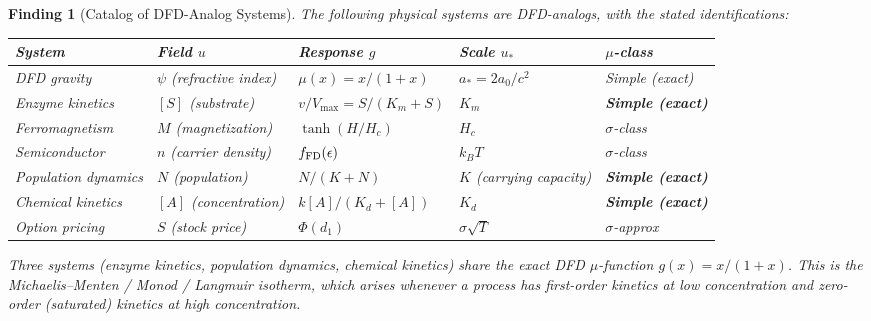 \documentclass[11pt]{article}
\newtheorem{finding}[theorem]{Finding}
\theoremstyle{definition}
\theoremstyle{remark}
\begin{document}
\begin{finding}[Catalog of DFD-Analog Systems]
\label{find:dfd-analog-catalog}
The following physical systems are DFD-analogs, with the stated
identifications:

\begin{center}
\begin{tabular}{@{}p{2.5cm}p{2.5cm}p{2.5cm}p{2cm}p{2.5cm}@{}}
\toprule
\textbf{System} & \textbf{Field $u$} & \textbf{Response $g$} &
\textbf{Scale $u_*$} & \textbf{$\mu$-class} \\
\midrule
DFD gravity & $\psi$ (refractive index) & $\mu(x) = x/(1+x)$ &
$a_* = 2a_0/c^2$ & Simple (exact) \\[4pt]
Enzyme kinetics & $[S]$ (substrate) &
$v/V_{\max} = S/(K_m + S)$ & $K_m$ &
\textbf{Simple (exact)} \\[4pt]
Ferromagnetism & $M$ (magnetization) &
$\tanh(H/H_c)$ & $H_c$ & $\sigma$-class \\[4pt]
Semiconductor & $n$ (carrier density) &
$f_{\rm FD}(\epsilon)$ & $k_BT$ & $\sigma$-class \\[4pt]
Population dynamics & $N$ (population) &
$N/(K+N)$ & $K$ (carrying capacity) &
\textbf{Simple (exact)} \\[4pt]
Chemical kinetics & $[A]$ (concentration) &
$k[A]/(K_d + [A])$ & $K_d$ &
\textbf{Simple (exact)} \\[4pt]
Option pricing & $S$ (stock price) &
$\Phi(d_1)$ & $\sigma\sqrt{T}$ & $\sigma$-approx \\
\bottomrule
\end{tabular}
\end{center}

Three systems (enzyme kinetics, population dynamics, chemical kinetics)
share the \emph{exact} DFD $\mu$-function $g(x) = x/(1+x)$. This is
the Michaelis--Menten / Monod / Langmuir isotherm, which arises whenever
a process has first-order kinetics at low concentration and zero-order
(saturated) kinetics at high concentration.
\end{finding}
\end{document}
